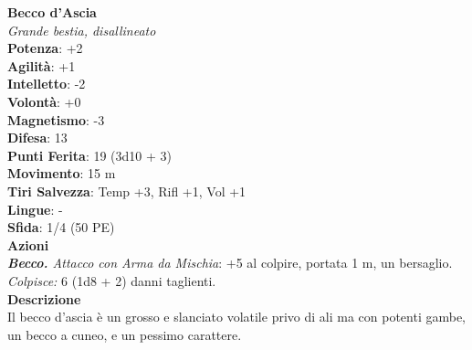 \begin{multicols}{2}
\medskip\textbf{Becco d'Ascia}\\
\emph{Grande bestia, disallineato}\\
\textbf{Potenza}: +2\\
\textbf{Agilità}: +1\\
\textbf{Intelletto}: -2\\
\textbf{Volontà}: +0\\
\textbf{Magnetismo}: -3\\
\textbf{Difesa}: 13\\
\textbf{Punti Ferita}: 19 (3d10 + 3)\\
\textbf{Movimento}: 15 m\\
\textbf{Tiri Salvezza}: Temp +3, Rifl +1, Vol +1\\
\textbf{Lingue}: -\\
\textbf{Sfida}: 1/4 (50 PE)\smallskip\\
\smallskip\textbf{Azioni}\\
\emph{\textbf{Becco.} Attacco con Arma da Mischia}: +5 al colpire, portata 1 m, un bersaglio.\\
\emph{Colpisce:} 6 (1d8 + 2) danni taglienti.\\

\textbf{Descrizione}\\
Il becco d'ascia è un grosso e slanciato volatile privo di ali ma con potenti gambe, un becco a cuneo, e un pessimo carattere.\\


\end{multicols}
